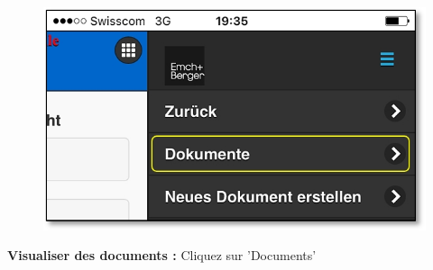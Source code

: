 \vspace{\baselineskip}

\begin{figure}   %
  \vspace{-35pt}      %
  \begin{center}
    \includegraphics[width=1\linewidth]{../chapters/11_Dokumentenablage/pictures/11-mob02_Dokumente_anschauen.jpg}
  \end{center}
  \vspace{-20pt}
  \vspace{-10pt}
\end{figure}


\textbf{Visualiser des documents :} Cliquez sur 'Documents'

\pagebreak

